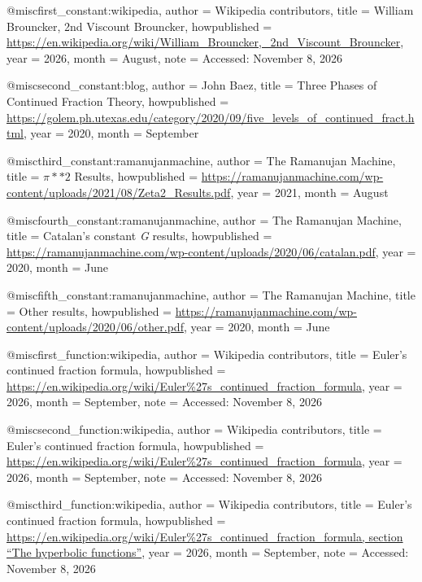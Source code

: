 @misc{first_constant:wikipedia,
    author = {Wikipedia contributors},
    title = {William Brouncker, 2nd Viscount Brouncker},
    howpublished = {\url{https://en.wikipedia.org/wiki/William_Brouncker,_2nd_Viscount_Brouncker}},
    year = {2026},
    month = {August},
    note = {Accessed: November 8, 2026}
}

@misc{second_constant:blog,
    author = {John Baez},
    title = {Three Phases of Continued Fraction Theory},
    howpublished = {\url{https://golem.ph.utexas.edu/category/2020/09/five_levels_of_continued_fract.html}},
    year = {2020},
    month = {September}
}

@misc{third_constant:ramanujanmachine,
    author = {The Ramanujan Machine},
    title = {{$\pi**2$} Results},
    howpublished = {\url{https://ramanujanmachine.com/wp-content/uploads/2021/08/Zeta2_Results.pdf}},
    year = {2021},
    month = {August}
}

@misc{fourth_constant:ramanujanmachine,
    author = {The Ramanujan Machine},
    title = {Catalan's constant {\textit{G}} results},
    howpublished = {\url{https://ramanujanmachine.com/wp-content/uploads/2020/06/catalan.pdf}},
    year = {2020},
    month = {June}
}

@misc{fifth_constant:ramanujanmachine,
    author = {The Ramanujan Machine},
    title = {Other results},
    howpublished = {\url{https://ramanujanmachine.com/wp-content/uploads/2020/06/other.pdf}},
    year = {2020},
    month = {June}
}

@misc{first_function:wikipedia,
    author = {Wikipedia contributors},
    title = {Euler's continued fraction formula},
    howpublished = {\url{https://en.wikipedia.org/wiki/Euler%27s_continued_fraction_formula}},
    year = {2026},
    month = {September},
    note = {Accessed: November 8, 2026}
}

@misc{second_function:wikipedia,
    author = {Wikipedia contributors},
    title = {Euler's continued fraction formula},
    howpublished = {\url{https://en.wikipedia.org/wiki/Euler%27s_continued_fraction_formula}},
    year = {2026},
    month = {September},
    note = {Accessed: November 8, 2026}
}

@misc{third_function:wikipedia,
    author = {Wikipedia contributors},
    title = {Euler's continued fraction formula},
    howpublished = {\url{https://en.wikipedia.org/wiki/Euler%27s_continued_fraction_formula, section “The hyperbolic functions”}},
    year = {2026},
    month = {September},
    note = {Accessed: November 8, 2026}
}

